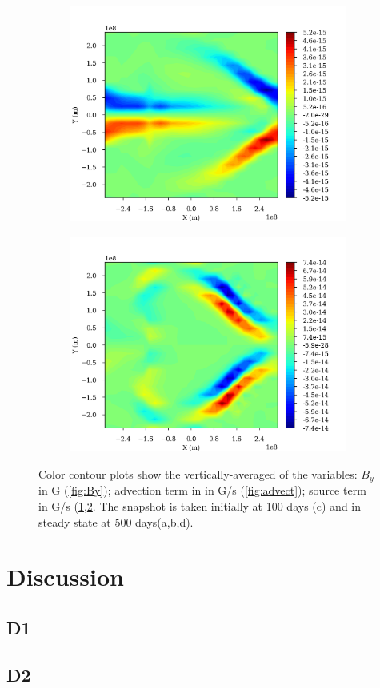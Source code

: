 \documentclass[11pt]{article}
\begin{document}
\begin{figure}
\begin{subfigure}{0.49\textwidth}
	\centering
	\includegraphics[width=\linewidth]{images/source_aver_100.png}
	\caption{}
	\label{fig:source100}
\end{subfigure}
\begin{subfigure}{0.49\textwidth}
	\centering
	\includegraphics[width=\linewidth]{images/source_aver_500.png}
	\caption{}
	\label{fig:source500}
\end{subfigure}
\caption{Color contour plots show the vertically-averaged of the variables: $B_y$ in G (\ref{fig:By}); advection term in in G/s (\ref{fig:advect}); source term in G/s (\ref{fig:source100},\ref{fig:source500}. The snapshot is taken initially at 100 days (c) and in steady state at 500 days(a,b,d).}
\label{fig:Misc}
\end{figure}
%

\section{Discussion}
\subsection{D1}
\subsection{D2}


\end{document}
